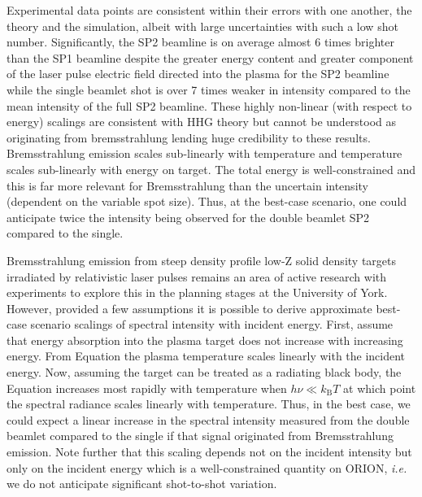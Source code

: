 Experimental data points are consistent within their errors with one another, the theory and the simulation, albeit with large uncertainties with such a low shot number. Significantly, the SP2 beamline is on average almost 6 times brighter than the SP1 beamline despite the greater energy content and greater component of the laser pulse electric field directed into the plasma for the SP2 beamline while the single beamlet shot is over 7 times weaker in intensity compared to the mean intensity of the full SP2 beamline. These highly non-linear (with respect to energy) scalings are consistent with HHG theory but cannot be understood as originating from bremsstrahlung lending huge credibility to these results. Bremsstrahlung emission scales sub-linearly with temperature and temperature scales sub-linearly with energy on target. The total energy is well-constrained and this is far more relevant for Bremsstrahlung than the uncertain intensity (dependent on the variable spot size). Thus, at the best-case scenario, one could anticipate twice the intensity being observed for the double beamlet SP2 compared to the single.





Bremsstrahlung emission from steep density profile low-Z solid density targets irradiated by relativistic laser pulses remains an area of active research with experiments to explore this in the planning stages at the University of York. However, provided a few assumptions it is possible to derive approximate best-case scenario scalings of spectral intensity with incident energy. First, assume that energy absorption into the plasma target does not increase with increasing energy. From Equation
the plasma temperature scales linearly with the incident energy. Now, assuming the target can be treated as a radiating black body, the Equation 
increases most rapidly with temperature when $h\nu \ll k_\mathrm{B}T$ at which point the spectral radiance scales linearly with temperature. Thus, in the best case, we could expect a linear increase in the spectral intensity measured from the double beamlet compared to the single if that signal originated from Bremsstrahlung emission. Note further that this scaling depends not on the incident intensity but only on the incident energy which is a well-constrained quantity on ORION, \textit{i.e.} we do not anticipate significant shot-to-shot variation.

